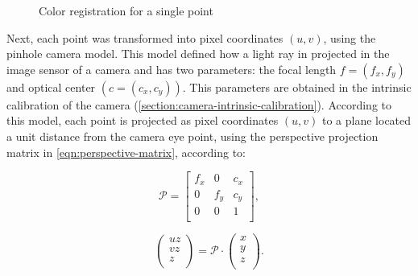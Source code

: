 \begin{figure}

    \caption{Color registration for a single point}
    \label{fig:color-registration-3d}
\end{figure}

Next, each point was transformed into pixel coordinates $(u, v)$, using the pinhole camera model. This model defined how a light ray in projected in the image sensor of a camera and has two parameters: the focal length $f = (f_x, f_y)$ and optical center $(c = (c_x, c_y))$. This parameters are obtained in the intrinsic calibration of the camera (\cref{section:camera-intrinsic-calibration}). According to this model, each point is projected as pixel coordinates $(u, v)$ to a plane located a unit distance from the camera eye point, using the perspective projection matrix in \cref{eqn:perspective-matrix}, according to:

\begin{equation}
    \label{eqn:perspective-matrix}
    \mathcal{P} =
    \left[
        \begin{array}{ccc}
            f_x & 0   & c_x \\
            0   & f_y & c_y \\
            0   & 0   & 1   \\
        \end{array}    
    \right],
\end{equation}

\begin{equation}
    \label{eqn:perpective-transformation}
    \left(
        \begin{array}{c}
            u z \\ v z \\ z \\
        \end{array}    
    \right)
    =
    \mathcal{P} \cdot
    \left(
        \begin{array}{c}
            x \\ y \\ z \\
        \end{array}    
    \right).
\end{equation}

